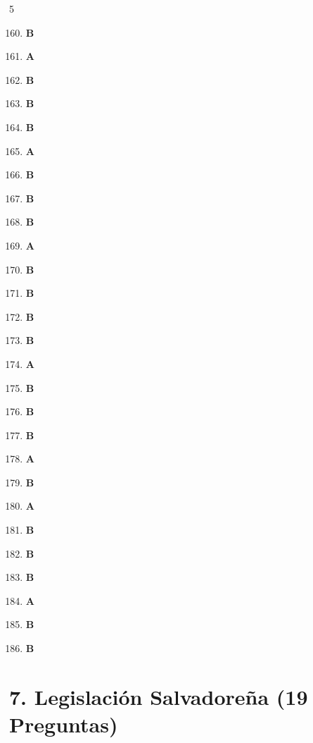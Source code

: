 \documentclass[10pt,a4paper]{article}
\begin{document}
\vspace{0.4cm}
\begin{tcolorbox}[colback=gray!5!white,colframe=gray!60!black,title=\textbf{CLAVE DE RESPUESTAS -- CONSTITUCIÓN DE LA REPÚBLICA Y DDHH}]
\begin{multicols}{5}
\begin{enumerate}[label=\textbf{\arabic*.}]
\setcounter{enumi}{159}
  \item \textbf{B}
  \item \textbf{A}
  \item \textbf{B}
  \item \textbf{B}
  \item \textbf{B}
  \item \textbf{A}
  \item \textbf{B}
  \item \textbf{B}
  \item \textbf{B}
  \item \textbf{A}
  \item \textbf{B}
  \item \textbf{B}
  \item \textbf{B}
  \item \textbf{B}
  \item \textbf{A}
  \item \textbf{B}
  \item \textbf{B}
  \item \textbf{B}
  \item \textbf{A}
  \item \textbf{B}
  \item \textbf{A}
  \item \textbf{B}
  \item \textbf{B}
  \item \textbf{B}
  \item \textbf{A}
  \item \textbf{B}
  \item \textbf{B}
\end{enumerate}
\end{multicols}
\end{tcolorbox}
\newpage\n
\section{7. Legislación Salvadoreña (19 Preguntas)}
\end{document}
